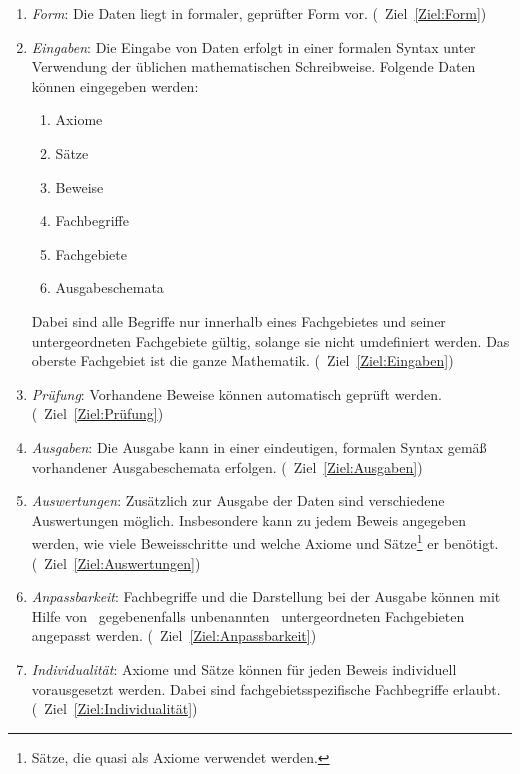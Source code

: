 \documentclass[english,ngerman,parskip=half,headsepline,footsepline]{scrreprt}
\begin{document}
	\begin{enumerate}

		\item \label{Anforderung:Form} \emph{Form}: Die Daten liegt in formaler, geprüfter Form vor. (\seename\ Ziel~\vref{Ziel:Form})

		\item \label{Anforderung:Eingaben} \emph{Eingaben}: Die Eingabe von Daten erfolgt in einer formalen Syntax unter Verwendung der üblichen mathematischen Schreibweise. Folgende Daten können eingegeben werden:
		\begin{enumerate}
			\item Axiome
			\item Sätze
			\item Beweise
			\item Fachbegriffe
			\item Fachgebiete
			\item Ausgabeschemata
		\end{enumerate}
		Dabei sind alle Begriffe nur innerhalb eines Fachgebietes und seiner untergeordneten Fachgebiete gültig, solange sie nicht umdefiniert werden. Das oberste Fachgebiet ist die ganze Mathematik. (\seename\ Ziel~\vref{Ziel:Eingaben})

		\item \label{Anforderung:Prüfung} \emph{Prüfung}: Vorhandene Beweise können automatisch geprüft werden. (\seename\ Ziel~\vref{Ziel:Prüfung})

		\item \label{Anforderung:Ausgaben} \emph{Ausgaben}: Die Ausgabe kann in einer eindeutigen, formalen Syntax gemäß vorhandener Ausgabeschemata erfolgen. (\seename\ Ziel~\vref{Ziel:Ausgaben})

		\item \label{Anforderung:Auswertungen} \emph{Auswertungen}: Zusätzlich zur Ausgabe der Daten sind verschiedene Auswertungen möglich. Insbesondere kann zu jedem Beweis angegeben werden, wie viele Beweisschritte und welche Axiome und Sätze\footnote{ Sätze, die quasi als Axiome verwendet werden.} er benötigt. (\seename\ Ziel~\vref{Ziel:Auswertungen})

		\item \label{Anforderung:Anpassbarkeit} \emph{Anpassbarkeit}: Fachbegriffe und die Darstellung bei der Ausgabe können mit Hilfe von \textendash\ gegebenenfalls unbenannten \textendash\ untergeordneten Fachgebieten angepasst werden. (\seename\ Ziel~\vref{Ziel:Anpassbarkeit})

		\item \label{Anforderung:Individualität} \emph{Individualität}: Axiome und Sätze können für jeden Beweis individuell vorausgesetzt werden. Dabei sind fachgebietsspezifische Fachbegriffe erlaubt. (\seename\ Ziel~\vref{Ziel:Individualität})


\end{enumerate}
\end{document}
